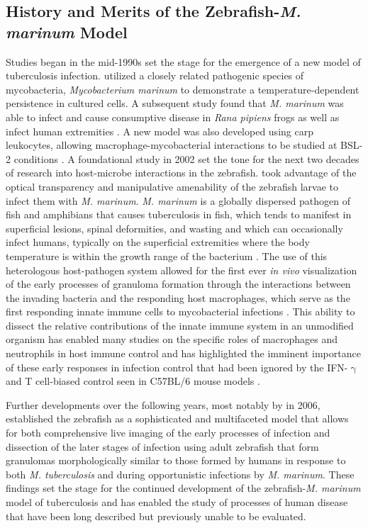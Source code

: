 \subsection{History and Merits of the Zebrafish\hyp{}\textit{M. marinum} Model}\label{zfmmhis}

Studies began in the mid\hyp{}1990s set the stage for the emergence of a new model of tuberculosis infection. \citeauthor{Ramakrishnan1994} utilized a closely related pathogenic species of mycobacteria, \textit{Mycobacterium marinum} to demonstrate a temperature\hyp{}dependent persistence in cultured cells. A subsequent study found that \textit{M. marinum} was able to infect and cause consumptive disease in \textit{Rana pipiens} frogs as well as infect human extremities \citep{Ramakrishnan1997a, Ramakrishnan1997b, Cosma2006}. A new model was also developed using carp leukocytes, allowing macrophage\hyp{}mycobacterial interactions to be studied at BSL\hyp{}2 conditions \citep{ElEtr2001}. A foundational study in 2002 set the tone for the next two decades of research into host\hyp{}microbe interactions in the zebrafish. \citeauthor{Davis2002} took advantage of the optical transparency and manipulative amenability of the zebrafish larvae to infect them with \textit{M. marinum}. \textit{M. marinum} is a globally dispersed pathogen of fish and amphibians that causes tuberculosis in fish, which tends to manifest in superficial lesions, spinal deformities, and wasting and which can occasionally infect humans, typically on the superficial extremities where the body temperature is within the growth range of the bacterium \citep{Hashish2018, Aronson1926, Gray1990, Parisot1958}. The use of this heterologous host\hyp{}pathogen system allowed for the first ever \textit{in vivo} visualization of the early processes of granuloma formation through the interactions between the invading bacteria and the responding host macrophages, which serve as the first responding innate immune cells to mycobacterial infections \citep{Davis2002, Davis2009}. This ability to dissect the relative contributions of the innate immune system in an unmodified organism has enabled many studies on the specific roles of macrophages and neutrophils in host immune control and has highlighted the imminent importance of these early responses in infection control that had been ignored by the IFN\hyp{}$\upgamma$ and T cell\hyp{}biased control seen in C57BL/6 mouse models \citep{Lesley2008}.

Further developments over the following years, most notably by \citeauthor{Swaim2006} in 2006, established the zebrafish as a sophisticated and multifaceted model that allows for both comprehensive live imaging of the early processes of infection and dissection of the later stages of infection using adult zebrafish that form granulomas morphologically similar to those formed by humans in response to both \textit{M. tuberculosis} and during opportunistic infections by \textit{M. marinum}. These findings set the stage for the continued development of the zebrafish\hyp{}\textit{M. marinum} model of tuberculosis and has enabled the study of processes of human disease that have been long described but previously unable to be evaluated.

